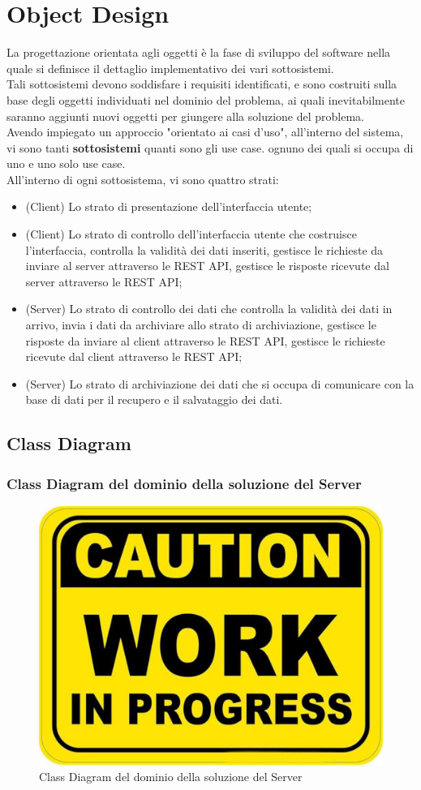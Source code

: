 \chapter{Object Design}
    La progettazione orientata agli oggetti è la fase di sviluppo del software nella quale si definisce il dettaglio implementativo dei vari sottosistemi. \\
    Tali sottosistemi devono soddisfare i requisiti identificati, e sono costruiti sulla base degli oggetti individuati nel dominio del problema, ai quali inevitabilmente saranno aggiunti nuovi oggetti per giungere alla soluzione del problema. \\
    Avendo impiegato un approccio "orientato ai casi d'uso", all'interno del sistema, vi sono tanti \textbf{sottosistemi} quanti sono gli use case. ognuno dei quali si occupa di uno e uno solo use case. \\
    All'interno di ogni sottosistema, vi sono quattro strati:
    \begin{itemize}
        \item (Client) Lo strato di presentazione dell'interfaccia utente;
        \item (Client) Lo strato di controllo dell'interfaccia utente che costruisce l'interfaccia, controlla la validità dei dati inseriti, gestisce le richieste da inviare al server attraverso le REST API, gestisce le risposte ricevute dal server attraverso le REST API;
        \item (Server) Lo strato di controllo dei dati che controlla la validità dei dati in arrivo, invia i dati da archiviare allo strato di archiviazione, gestisce le risposte da inviare al client attraverso le REST API, gestisce le richieste ricevute dal client attraverso le REST API;
        \item (Server) Lo strato di archiviazione dei dati che si occupa di comunicare con la base di dati per il recupero e il salvataggio dei dati.
    \end{itemize}
    

    \section{Class Diagram}
        \subsection{Class Diagram del dominio della soluzione del Server}
            \begin{figure}[htbp!]
                \centering
                    \includegraphics[width=0.1\linewidth]{Immagini/WorkInProgress.pdf}
                \caption{Class Diagram del dominio della soluzione del Server}
                \label{fig:Class Diagram del dominio della soluzione del Server}
            \end{figure}
    
